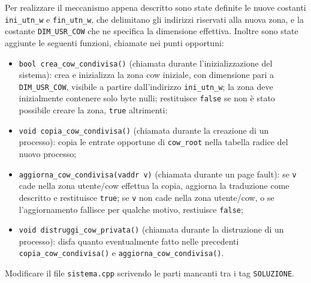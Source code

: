 Per realizzare il meccanismo appena descritto sono state definite le nuove
costanti {\tt ini\_utn\_w} e {\tt fin\_utn\_w}, che delimitano gli indirizzi
riservati alla nuova zona, e la costante {\tt DIM\_USR\_COW} che ne specifica
la dimensione effettiva. Inoltre sono state aggiunte le seguenti funzioni, chiamate
nei punti opportuni:
\begin{itemize}
  \item {\tt bool crea\_cow\_condivisa()} (chiamata durante l'inizializzazione del sistema):
    crea e inizializza la zona cow iniziale,
    con dimensione pari a {\tt DIM\_USR\_COW}, visibile a partire dall'indirizzo
    {\tt ini\_utn\_w}; la zona deve inizialmente contenere solo byte nulli;
    restituisce {\tt false} se non \`e stato possibile creare la zona, {\tt true} altrimenti;
  \item {\tt void copia\_cow\_condivisa()} (chiamata durante la creazione di un processo):
    copia le entrate opportune di {\tt cow\_root} nella tabella radice del nuovo
    processo;
  \item {\tt aggiorna\_cow\_condivisa(vaddr v)} (chiamata durante un page fault):
    se {\tt v} cade nella zona utente/cow effettua la copia, aggiorna la traduzione
    come descritto e restituisce {\tt true};
    se {\tt v} non cade nella zona utente/cow, o se l'aggiornamento fallisce per qualche motivo,
    restiuisce {\tt false};
  \item {\tt void distruggi\_cow\_privata()} (chiamata durante la distruzione di un processo):
    disfa quanto eventualmente fatto nelle precedenti {\tt copia\_cow\_condivisa()} e
    {\tt aggiorna\_cow\_condivisa()}.
\end{itemize}
Modificare il file {\tt sistema.cpp} scrivendo le parti mancanti tra i tag {\tt SOLUZIONE}.
